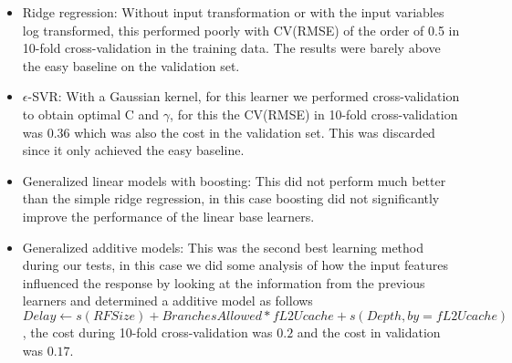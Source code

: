 \documentclass[a4paper, 11pt]{article}
\begin{document}
\begin{itemize}
	\item Ridge regression: Without input transformation or with the input variables log transformed, this performed poorly with CV(RMSE) of the order of 0.5 in 10-fold cross-validation in the training data. The results were barely above the easy baseline on the validation set.
	\item $\epsilon$-SVR: With a Gaussian kernel, for this learner we performed cross-validation to obtain optimal C and $\gamma$, for this the CV(RMSE) in 10-fold cross-validation was 0.36 which was also the cost in the validation set. This was discarded since it only achieved the easy baseline.
	\item Generalized linear models with boosting: This did not perform much better than the simple ridge regression, in this case boosting did not significantly improve the performance of the linear base learners.
	\item Generalized additive models: This was the second best learning method during our tests, in this case we did some analysis of how the input features influenced the response by looking at the information from the previous learners and determined a additive model as follows $Delay \leftarrow s(RFSize)+ BranchesAllowed*fL2Ucache + s(Depth, by=fL2Ucache)$, the cost during 10-fold cross-validation was $0.2$ and the cost in validation was $0.17$.
	
\end{itemize}



\end{document}
